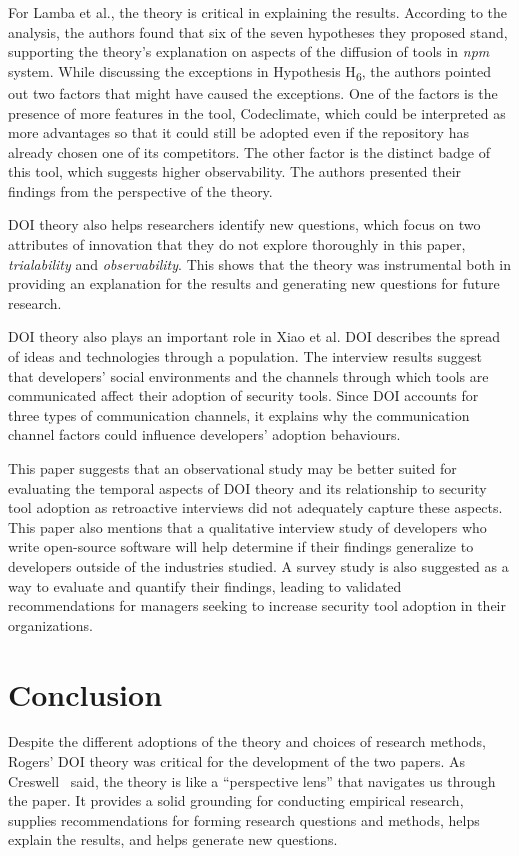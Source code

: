 \documentclass[journal,12pt,onecolumn,]{IEEEtran}
\begin{document}
For Lamba et al., the theory is critical in explaining the results. According to the analysis, the authors found that six of the seven hypotheses they proposed
stand, supporting the theory's explanation on aspects of the diffusion of tools in \textit{npm} system.
While discussing the exceptions in Hypothesis H\textsubscript{6}, the authors pointed out two factors that might have caused the exceptions. One of the factors is the presence of more features in the tool, Codeclimate, which could be interpreted as more advantages so that it could still be adopted even if the repository has already chosen one of its competitors. 
The other factor is the distinct badge of this tool, which suggests higher observability.
The authors presented their findings from the perspective of the theory.

DOI theory also helps researchers identify new questions, which focus on two attributes of innovation that they do not explore thoroughly in this paper, \textit{trialability} and \textit{observability}.
This shows that the theory was instrumental both in providing an explanation for the results and generating new questions for future research.

DOI theory also plays an important role in Xiao et al. DOI describes the spread of ideas and technologies through a population.
The interview results suggest that developers' social environments and the channels through which tools are communicated affect their adoption of security tools. Since DOI accounts for three types of communication channels, it explains why the communication channel factors could influence developers' adoption behaviours.

This paper suggests that an observational study may be better suited for evaluating the temporal aspects of DOI theory and its relationship to security tool adoption as retroactive interviews did not adequately capture these aspects. This paper also mentions that a qualitative interview study of developers who write open-source software will help determine if their findings generalize to developers outside of the industries studied.
A survey study is also suggested as a way to evaluate and quantify their findings, leading to validated recommendations for managers seeking to increase security tool adoption in their organizations.
\section{Conclusion}

Despite the different adoptions of the theory and choices of research methods, Rogers' DOI theory was critical for the development of the two papers.
As Creswell~\cite{creswell2017research} said, the theory is like a ``perspective lens'' that navigates us through the paper. It provides a solid grounding for conducting empirical research, supplies recommendations for forming research questions and methods,
helps explain the results, and helps generate new questions.
\end{document}
